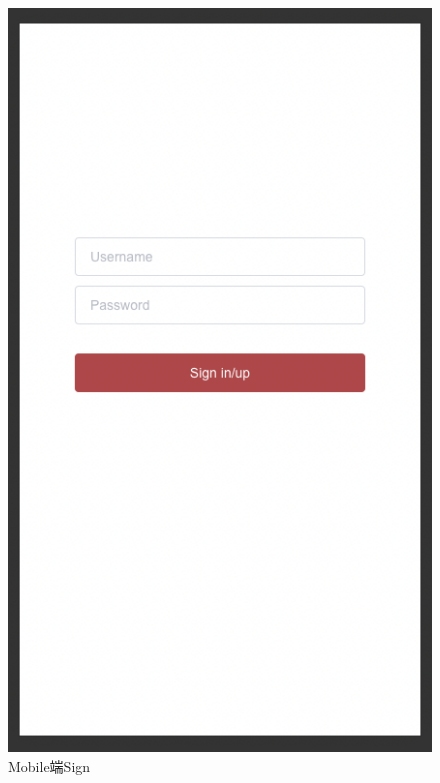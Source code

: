 \documentclass[hyperref]{ctexart}
\begin{document}
\begin{multicols}{2}
\begin{figure}[H]
        \includegraphics[scale=0.22]{figure/15.png}
        \caption{Mobile端Sign}
        \label{Fig.1.15}
    \end{figure}
    \begin{figure}[H]
        \centering

\end{figure}
\end{multicols}
\end{document}
